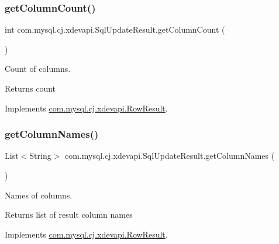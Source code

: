 \subsubsection{\texorpdfstring{get\+Column\+Count()}{getColumnCount()}}
{\footnotesize\ttfamily int com.\+mysql.\+cj.\+xdevapi.\+Sql\+Update\+Result.\+get\+Column\+Count (\begin{DoxyParamCaption}{ }\end{DoxyParamCaption})}

Count of columns.

\begin{DoxyReturn}{Returns}
count 
\end{DoxyReturn}


Implements \mbox{\hyperlink{interfacecom_1_1mysql_1_1cj_1_1xdevapi_1_1_row_result_aaf66f729c7c99e7ceb90ea49c4631ef0}{com.\+mysql.\+cj.\+xdevapi.\+Row\+Result}}.

\mbox{\label{classcom_1_1mysql_1_1cj_1_1xdevapi_1_1_sql_update_result_a46b0f0ea62ed9ed071f14eee6a4ff743}} 
\subsubsection{\texorpdfstring{get\+Column\+Names()}{getColumnNames()}}
{\footnotesize\ttfamily List$<$String$>$ com.\+mysql.\+cj.\+xdevapi.\+Sql\+Update\+Result.\+get\+Column\+Names (\begin{DoxyParamCaption}{ }\end{DoxyParamCaption})}

Names of columns.

\begin{DoxyReturn}{Returns}
list of result column names 
\end{DoxyReturn}


Implements \mbox{\hyperlink{interfacecom_1_1mysql_1_1cj_1_1xdevapi_1_1_row_result_acbc412c859e4618f3b924c602a82f541}{com.\+mysql.\+cj.\+xdevapi.\+Row\+Result}}.

\mbox{\label{classcom_1_1mysql_1_1cj_1_1xdevapi_1_1_sql_update_result_a229524cce1f3a1157e52d8f3d7b9dfc1}} 
